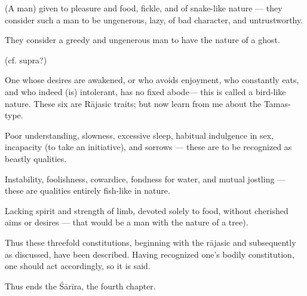 \begin{translation}
\begin{tt}
(A man) given to pleasure and food, fickle, and of snake-like nature — they consider such a man  to be ungenerous, lazy, of bad character, and untrustworthy.

\item[94]

They consider a greedy and  ungenerous man to have the nature of a ghost.

\item[91]  (cf. supra?)

One whose desires are awakened, or who avoids enjoyment,
who constantly eats, and who indeed (is) intolerant, has no fixed abode— this is called a bird-like nature. These six are Rājasic traits; but now learn from me about the Tamas-type.

\item[95]

Poor understanding, slowness, excessive sleep, habitual indulgence in sex, incapacity (to take an initiative), and sorrows — these are to be recognized as beastly qualities.

\item[96]

Instability, foolishness, cowardice, fondness for water, and mutual jostling — these are qualities entirely fish-like in nature.

\item[97]

Lacking spirit and strength of limb, devoted solely to food, without cherished aims or desires  — that would be a man with the nature of a tree).

\item[98]

Thus these threefold constitutions, beginning with the rājasic and subsequently as discussed, have been described. Having recognized one’s bodily constitution, one should act accordingly, so it is said. 

\item[99]

Thus ends the Śārīra, the fourth chapter.

\end{tt}
\end{translation}